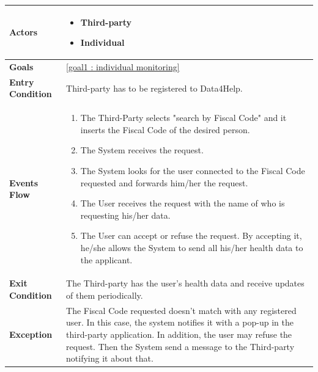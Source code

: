             \begin{table}[H]
            	\centering
                
                \begin{tabular}{|p{3cm}|p{8.2cm}|}
                    \hline
                    \textbf{Actors} &  \begin{itemize}
                                            \item Third-party
                                            \item Individual
                                        \end{itemize}\\
                     \hline
                    \textbf{Goals} & \ref{goal1 : individual monitoring}\\ 
                     \hline
                    \textbf{Entry Condition} & Third-party has to be registered to Data4Help.\\
                     \hline
                    \textbf{Events Flow} & \begin{enumerate}
                                                \item The Third-Party selects "search by Fiscal Code" and it inserts the Fiscal Code of the desired person.
                                                \item The System receives the request.
                                                \item The System looks for the user connected to the Fiscal Code requested and forwards him/her the request.
                                                \item The User receives the request with the name of who is requesting his/her data.
                                                 \item The User can accept or refuse the request. By accepting it, he/she allows the System to send all his/her health data to the applicant.
                                            \end{enumerate}\\
                     \hline
                    \textbf{Exit Condition} & The Third-party has the user's health data and receive updates of them periodically. \\
                     \hline
                    \textbf{Exception} & The Fiscal Code requested doesn't match with any registered user. In this case, the system notifies it with a pop-up in the third-party application. In addition, the user may refuse the request. Then the System send a message to the Third-party notifying it about that. \\
                     \hline
                \end{tabular}  
            \end{table} 
            
